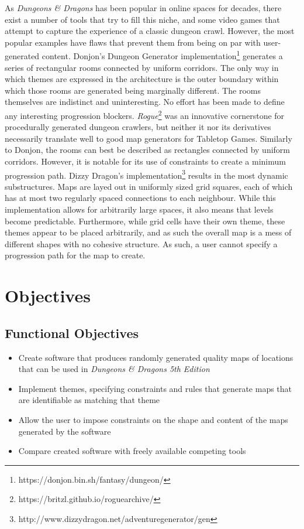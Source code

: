 \documentclass{article}
\begin{document}
As \textit{Dungeons \& Dragons} has been popular in online spaces for decades, there exist a number of tools that try to fill this niche, and some video games that attempt to capture the experience of a classic dungeon crawl. However, the most popular examples have flaws that prevent them from being on par with user-generated content.
Donjon's Dungeon Generator implementation\footnote{https://donjon.bin.sh/fantasy/dungeon/} generates a series of rectangular rooms connected by uniform corridors. The only way in which themes are expressed in the architecture is the outer boundary within which those rooms are generated being marginally different. The rooms themselves are indistinct and uninteresting. No effort has been made to define any interesting progression blockers.
\textit{Rogue}\footnote{https://britzl.github.io/roguearchive/} was an innovative cornerstone for procedurally generated dungeon crawlers, but neither it nor its derivatives necessarily translate well to good map generators for Tabletop Games. Similarly to Donjon, the rooms can best be described as rectangles connected by uniform corridors. However, it is notable for its use of constraints to create a minimum progression path.
Dizzy Dragon's implementation\footnote{http://www.dizzydragon.net/adventuregenerator/gen} results in the most dynamic substructures. Maps are layed out in uniformly sized grid squares, each of which has at most two regularly spaced connections to each neighbour. While this implementation allows for arbitrarily large spaces, it also means that levels become predictable. Furthermore, while grid cells have their own theme, these themes appear to be placed arbitrarily, and as such the overall map is a mess of different shapes with no cohesive structure. As such, a user cannot specify a progression path for the map to create.

\section{Objectives}
\subsection{Functional Objectives}
\begin{itemize}
    \item Create software that produces randomly generated quality maps of locations that can be used in \textit{Dungeons \& Dragons 5th Edition}
    \item Implement themes, specifying constraints and rules that generate maps that are identifiable as matching that theme
    \item Allow the user to impose constraints on the shape and content of the maps generated by the software
    \item Compare created software with freely available competing tools
\end{itemize}
\end{document}
